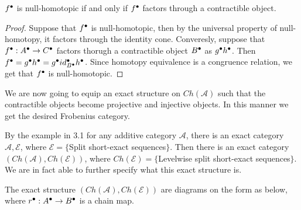     \begin{lemma}
        $f^{\bullet}$ is null-homotopic if and only if $f^{\bullet}$ factors through a contractible object.
    \end{lemma}

    \begin{proof}
        Suppose that $f^{\bullet}$ is null-homotopic, then by the universal property of null-homotopy, it factors through the identity cone.
        Converesly, suppose that $f^{\bullet}:A^{\bullet}\rightarrow C^{\bullet}$ factors thorugh a contractible object $B^{\bullet}$ as $g^{\bullet}h^{\bullet}$. Then $f^{\bullet}=g^{\bullet}h^{\bullet}=g^{\bullet}id_{B^{\bullet}}^{\bullet}h^{\bullet}$. Since homotopy equivalence is a congruence relation, we get that $f^{\bullet}$ is null-homotopic.
    \end{proof}

    We are now going to equip an exact structure on $Ch(\mathcal{A})$ such that the contractible objects become projective and injective objects. In this manner we get the desired Frobenius category.

    By the example in 3.1 for any additive category $\mathcal{A}$, there is an exact category $\mathcal{A},\mathcal{E}$, where $\mathcal{E}=\{$Split short-exact sequences$\}$. Then there is an exact category $(Ch(\mathcal{A}),Ch(\mathcal{E}))$, where $Ch(\mathcal{E})=\{$Levelwise split short-exact sequences$\}$. We are in fact able to further specify what this exact structure is.

    \begin{prop}
        The exact structure $(Ch(\mathcal{A}),Ch(\mathcal{E}))$ are diagrams on the form as below, where $r^{\bullet}:A^{\bullet}\rightarrow B^{\bullet}$ is a chain map.
        \begin{center}
        \end{center}
    \end{prop}

